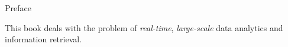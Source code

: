 
Preface

This book deals with the problem of \textit{real-time}, \textit{large-scale} data analytics and information retrieval.
